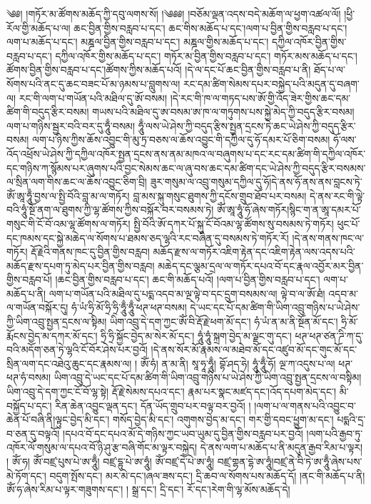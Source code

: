 \setcounter{footnote}{0} 
༄༅། །གཏོར་མ་ཚོགས་མཆོད་ཀྱི་དབུ་ལགས་སོ། །༄༅༅། །བཅོམ་ལྡན་འདས་བདེ་མཆོག་ལ་ཕྱག་འཚལ་ལོ། །ཕྱི་རོལ་གྱི་མཆོད་པ་ལ། ཆང་བྱིན་གྱིས་བརླབ་པ་དང་། ཆང་གིས་མཆོད་པ་དང་།ལག་པ་བྱིན་གྱིས་བརླབ་པ་དང་། ལག་པ་མཆོད་པ་དང་། མཎྜལ་བྱིན་གྱིས་བརླབ་པ་དང་། མཎྜལ་གྱིས་མཆོད་པ་དང་། དཀྱིལ་འཁོར་བྱིན་གྱིས་བརླབ་པ་དང་། དཀྱིལ་འཁོར་གྱིས་མཆོད་པ་དང་། གཏོར་མ་བྱིན་གྱིས་བརླབ་པ་དང་། གཏོར་མས་མཆོད་པ་དང་། ཚོགས་བྱིན་གྱིས་བརླབ་པ་དང་།ཚོགས་ཀྱིས་མཆོད་པའོ། །དེ་ལ་དང་པོ་ཆང་བྱིན་གྱིས་བརླབ་པ་ནི། ཐོད་པ་ལ་སོགས་པའི་ནང་དུ་ཆང་བཟང་པོ་མ་ཉམས་པ་བླུགས་ལ། རང་དམ་ཚིག་སེམས་དཔར་བསྐྱེད་པའི་མདུན་དུ་བཞག་ལ། རང་གི་ལག་པ་གཡོན་པའི་མཐིལ་དུ་ཨོ་བསམ། །དེ་རང་གི་ཁ་ལ་གཏད་པས་ཨོ་གྱི་འོད་ཟེར་གྱིས་ཆང་དམ་ཚིག་གི་བདུད་རྩིར་བསམ། གཡས་པའི་མཐིལ་དུ་ཨ་བསམ་ཨ་ཁ་ལ་གཏུགས་པས་སྐྱེ་མེད་ཀྱི་བདུད་རྩིར་བསམ། ལག་པ་གཉིས་སྦྱར་བའི་བར་དུ་ཧཱུྃ་བསམ། ཧཱུྃ་ལས་ཡེ་ཤེས་ཀྱི་བདུད་རྩིས་སྤྱན་དྲངས་ཏེ་ཆང་ཡེ་ཤེས་ཀྱི་བདུད་རྩིར་བསམ། ལག་པ་ཉིས་ཀྱིས་ཆོས་འབྱུང་གི་མུ་ཏྲ་བཅས་ལ་ཆོས་འབྱུང་གི་དཀྱིལ་དུ་ཧོ་དམར་པོ་ཅིག་བསམ། ཧོ་ལས་འོད་འཕྲོས་ཡེ་ཤེས་ཀྱི་དཀྱིལ་འཁོར་སྤྱན་དྲངས་ནས་ནམ་མཁའ་ལ་བཞུགས་པ་དང་རང་དམ་ཚིག་གི་དཀྱིལ་འཁོར་དང་གཉིས་ཀ་སྙོམས་པར་ཞུགས་པའི་བྱང་སེམས་ཆང་ལ་ཞུ་བས་ཆང་དམ་ཚིག་དང་ཡེ་ཤེས་ཀྱི་བདུད་རྩིར་བསམས་ལ་སྲིན་ལག་གིས་ཆང་ལ་ཆོས་འབྱུང་ཅིག་བྲི། ཟུར་གསུམ་ལ་འབྲུ་གསུམ་དཀྱིལ་དུ་ཧོ།དེ་ནས་ཧོ་ནས་ནས་བླངས་ཏེ་ཨོཾ་ཨཱ་ཧཱུྃ་བྱས་ལ་སྤྱི་བོའི་བླ་མ་ལ་གཏོར། བླ་མས་སྐུ་གསུང་ཐུགས་ཀྱི་དངོས་གྲུབ་ཐོབ་པར་བསམ། དེ་ནས་རང་གི་ལྟེ་བའི་ཧཱུཾ་སྔོ་ནག་ལ་ཐུགས་ཀྱི་ལྷ་ཚོགས་ཀྱིས་བསྐོར་བར་བསམས་ཏེ། ཨོཾ་ཨཱ་ཧཱུཾ་ཧོ་ཞེས་གཏོར།སྙིང་ག་ན་ཨཱ་དམར་པོ་གསུང་གི་ངོ་བོ་འམ་ལྷ་ཚོགས་ལ་གཏོར། སྤྱི་བོའི་ཨོ་དཀར་པོ་སྐུ་ངོ་བོའམ་ལྷ་ཚོགས་སུ་བསམས་ཏེ་གཏོར། ཕུང་པོ་དང་ཁམས་དང་སྐྱེ་མཆེད་ལ་སོགས་པ་ཐམས་ཅད་ལྷའི་རང་བཞིན་དུ་བསམས་ཏེ་གཏོར་རོ། །དེ་ནས་གནས་ཁང་ལ་གཏོར། རྡོ་རྗེའི་གནས་ཁང་དུ་བྱིན་གྱིས་བརླབ། མཆོད་རྫས་ལ་གཏོར་འཇིག་རྟེན་དང་འཇིག་རྟེན་ལས་འདས་པའི་མཆོད་རྫས་དཔག་ཏུ་མེད་པར་བྱིན་གྱིས་བརླབ། མཆེད་དང་ལྕམ་དྲལ་ལ་གཏོར་དཔའ་བོ་དང་རྣལ་འབྱོར་མར་བྱིན་གྱིས་བརླབ་པོ། །ཆང་བྱིན་གྱིས་བརླབ་པ་དང་། ཆང་གི་མཆོད་པའོ། །ལག་པ་བྱིན་གྱིས་བརླབ་པ་དང་། ལག་པ་མཆོད་པ་ནི། ལག་པ་གཡོན་པའི་མཐིལ་དུ་པདྨ་འདབ་མ་ལྔ་ལྟེ་བ་དང་དྲུག་བསམས་ལ། ལྟེ་བ་ལ་ཨོ་ཐཾ། འདབ་མ་ལ་གཡོན་བསྐོར་དུ། ཧཾ་ཡཾ་ཧྲི་མོ་ཧྲི་ཧྲི་ཧཱུྃ་ཧཱུྃ་ཕཊ་ཕཊ་བསམ། དེ་ཡང་དང་པོ་དམ་ཚིག་གི་ཡིག་འབྲུ་གཉིས་པ་ཡེ་ཤེས་ཀྱི་ཡིག་འབྲུ་སྤྱན་དྲངས་ལ་སྟིམ། ཡིག་འབྲུ་དེ་དག་ཀྱང་ཨོཾ་བི་རྡོ་རྗེ་ཕག་མོ་དང་། ཧཾ་ཡཾ་ན་མ་ནི་སྔོན་མོ་དང་། ཧྲི་མོ་རྨོངས་བྱེད་མ་དཀར་མོ་དང་། ཧྲི་ཧྲི་སྐྱོང་བྱེད་མ་སེར་མོ་དང་། ཧཱུཾ་ཧཱུཾ་སྐྲག་བྱེད་མ་ལྗང་གུ་དང་། ཕཊ་ཕཊ་ཙན་ཌི་ཀ་དུ་བའི་མདོག་ཅན་ཏེ་ལྷའི་ངོ་བོར་ཤེས་པར་བྱའོ། །དེ་ནས་སོར་མོ་རྣམས་ལ་མཐེབ་མོ་དང་འཛུབ་མོ་དང་གུང་མོ་དང་སྲིན་ལག་དང་འཐེའུ་ཆུང་དང་རྣམས་ལ། ། ཨོཾ་ཧཾ། ན་མ་ནི། སཱ་ཧཱ་ཧཱུྃ། བྷོ་ཤད་ཧེ། ཧཱུཾ་ཧཱུྃ་ཧོ། ལྔ་ཀ་འདུས་པ་ལ། ཕཊ་ཕཊ་ཧཾ་བསམ། ཡིག་འབྲུ་དེ་ཡང་དང་པོ་དམ་ཚིག་གི་ཡིག་འབྲུ་གཉིས་པ་ཡེ་ཤེས་ཀྱི་ཡིག་འབྲུ་སྤྱན་དྲངས་ལ་བསྟིམ། ཡིག་འབྲུ་དེ་དག་ཀྱང་ངོ་བོ་ལྷ་སྟེ། རྡོ་རྗེ་སེམས་དཔའ་དང་། རྣམ་པར་སྣང་མཛད་དང་།འོད་དཔག་མེད་དང་། མི་བསྐྱོད་པ་དང་། རིན་ཆེན་འབྱུང་ལྡན་དང་། དོན་ཡོད་གྲུབ་པར་བལྟ་བར་བྱའོ། ། །ལག་པ་ལ་གནས་པའི་འབྱུང་བ་ཆེན་པོ་བཞི་ནི།ལྟུང་བྱེད་མི་དང་། གསོད་བྱེད་མི་དང་། འགུགས་བྱེད་མ་དང་། གར་གྱི་དབང་ཕྱུག་མ་དང་། པདྨའི་དྲ་བ་ཅན་དུ་བལྟའོ། །དཔའ་བོ་དང་དཔའ་མོ་དེ་གཉིས་ཀྱང་ཡབ་ཡུམ་དུ་བྱིན་གྱིས་བརླབ་པར་བྱའོ། །ལག་པའི་རྒྱབ་ཏུ་འཁོར་ལོ་གསུམ་ལ་དཔའ་བོ་ཉི་ཤུ་རྩ་བཞི་གོང་མ་ལྟར་བསྐྱེད། དེ་ནས་ལག་པ་མཆོད་པ་ནི་མདུན་རྒྱབ་རིམ་པ་ལྟར། ། ཨོཾ་ཧ། ཨོཾ་བཛྲ་པུས་པེ་ཨ་ཧཱུྃ། བཛྲ་དྷུ་པེ་ཨ་ཧཱུཾ། ཨོཾ་བཛྲ་དེ་པེ་ཨ་ཧཱུཾ། བཛྲ་གྷན་དྷེ་ཨ་ཧཱུཾ།བཛྲ་ནེ་བི་ཏེ་ཨ་ཧཱུྃ་ཞེས་པས་མེ་ཏོག་དང་། བདུག་སྤོས་དང་། མར་མེ་དང་།ཞལ་ཟས་དང་། དྲི་ཆབ་ལ་སོགས་པས་མཆོད་དོ། །ནང་གི་མཆོད་པ་ནི།ཨོཾ་ཧ་ཞེས་རིམ་པ་ལྟར་གཟུགས་དང་། ། སྒྲ་དང་། དྲི་དང་། རོ་དང་།རེག་གི་ལྷ་མོས་མཆོད་དེ། 
